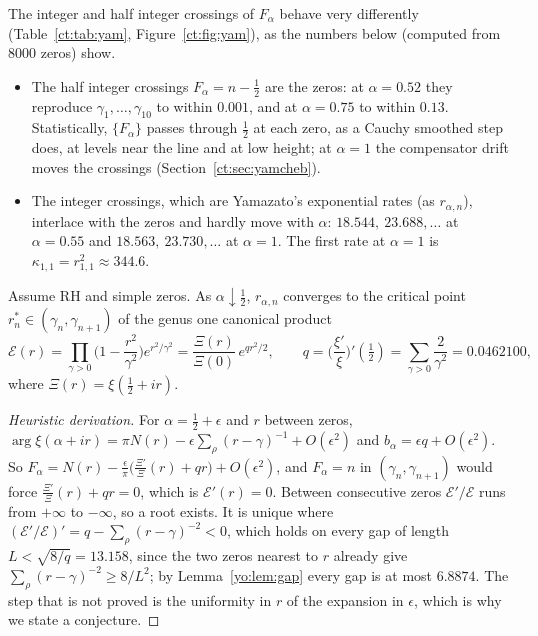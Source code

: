 The integer and half integer crossings of $F_\alpha$ behave very differently (Table~\ref{ct:tab:yam}, Figure~\ref{ct:fig:yam}), as the numbers below (computed from $8000$ zeros) show.
\begin{itemize}
\item The half integer crossings $F_\alpha=n-\frac12$ are the zeros: at $\alpha=0.52$ they reproduce $\gamma_1,\ldots,\gamma_{10}$ to within $0.001$, and at $\alpha=0.75$ to within $0.13$. Statistically, $\{F_\alpha\}$ passes through $\frac12$ at each zero, as a Cauchy smoothed step does, at levels near the line and at low height; at $\alpha=1$ the compensator drift moves the crossings (Section~\ref{ct:sec:yamcheb}).
\item The integer crossings, which are Yamazato's exponential rates (as $r_{\alpha,n}$), interlace with the zeros and hardly move with $\alpha$: $18.544,\allowbreak\ 23.688,\ldots$ at $\alpha=0.55$ and $18.563,\allowbreak\ 23.730,\ldots$ at $\alpha=1$. The first rate at $\alpha=1$ is $\kappa_{1,1}=r_{1,1}^2\approx344.6$.
\end{itemize}

\begin{conjecture}\label{ct:conj:canonical}
Assume RH and simple zeros. As $\alpha\downarrow\frac12$, $r_{\alpha,n}$ converges to the critical point $r^*_n\in(\gamma_n,\gamma_{n+1})$ of the genus one canonical product
\[
\mathcal E(r)=\prod_{\gamma>0}\Big(1-\frac{r^2}{\gamma^2}\Big)e^{r^2/\gamma^2}=\frac{\Xi(r)}{\Xi(0)}\,e^{qr^2/2},\qquad
q=\Big(\frac{\xi'}{\xi}\Big)'(\tfrac12)=\sum_{\gamma>0}\frac2{\gamma^2}=0.0462100,
\]
where $\Xi(r)=\xi(\frac12+ir)$.
\end{conjecture}
\begin{proof}[Heuristic derivation]
For $\alpha=\frac12+\epsilon$ and $r$ between zeros, $\arg\xi(\alpha+ir)=\pi N(r)-\epsilon\sum_\rho(r-\gamma)^{-1}+O(\epsilon^2)$ and $b_\alpha=\epsilon q+O(\epsilon^2)$. So $F_\alpha=N(r)-\frac\epsilon\pi\big(\frac{\Xi'}{\Xi}(r)+qr\big)+O(\epsilon^2)$, and $F_\alpha=n$ in $(\gamma_n,\gamma_{n+1})$ would force $\frac{\Xi'}{\Xi}(r)+qr=0$, which is $\mathcal E'(r)=0$. Between consecutive zeros $\mathcal E'/\mathcal E$ runs from $+\infty$ to $-\infty$, so a root exists. It is unique where $(\mathcal E'/\mathcal E)'=q-\sum_\rho(r-\gamma)^{-2}<0$, which holds on every gap of length $L<\sqrt{8/q}=13.158$, since the two zeros nearest to $r$ already give $\sum_\rho(r-\gamma)^{-2}\ge8/L^2$; by Lemma~\ref{yo:lem:gap} every gap is at most $6.8874$. The step that is not proved is the uniformity in $r$ of the expansion in $\epsilon$, which is why we state a conjecture.
\end{proof}

